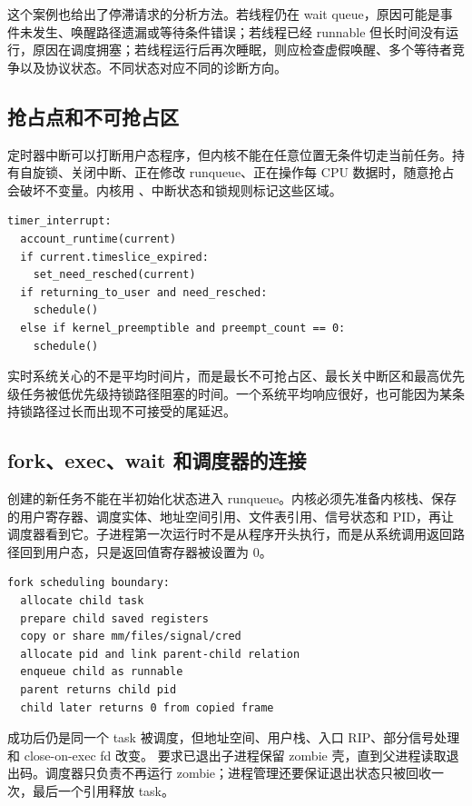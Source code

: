 这个案例也给出了停滞请求的分析方法。若线程仍在 wait queue，原因可能是事件未发生、唤醒路径遗漏或等待条件错误；若线程已经 runnable 但长时间没有运行，原因在调度拥塞；若线程运行后再次睡眠，则应检查虚假唤醒、多个等待者竞争以及协议状态。不同状态对应不同的诊断方向。

\subsection{抢占点和不可抢占区}

定时器中断可以打断用户态程序，但内核不能在任意位置无条件切走当前任务。持有自旋锁、关闭中断、正在修改 runqueue、正在操作每 CPU 数据时，随意抢占会破坏不变量。内核用 、中断状态和锁规则标记这些区域。

\begin{lstlisting}
timer_interrupt:
  account_runtime(current)
  if current.timeslice_expired:
    set_need_resched(current)
  if returning_to_user and need_resched:
    schedule()
  else if kernel_preemptible and preempt_count == 0:
    schedule()
\end{lstlisting}

实时系统关心的不是平均时间片，而是最长不可抢占区、最长关中断区和最高优先级任务被低优先级持锁路径阻塞的时间。一个系统平均响应很好，也可能因为某条持锁路径过长而出现不可接受的尾延迟。

\subsection{fork、exec、wait 和调度器的连接}

 创建的新任务不能在半初始化状态进入 runqueue。内核必须先准备内核栈、保存的用户寄存器、调度实体、地址空间引用、文件表引用、信号状态和 PID，再让调度器看到它。子进程第一次运行时不是从程序开头执行，而是从系统调用返回路径回到用户态，只是返回值寄存器被设置为 0。

\begin{lstlisting}
fork scheduling boundary:
  allocate child task
  prepare child saved registers
  copy or share mm/files/signal/cred
  allocate pid and link parent-child relation
  enqueue child as runnable
  parent returns child pid
  child later returns 0 from copied frame
\end{lstlisting}

 成功后仍是同一个 task 被调度，但地址空间、用户栈、入口 RIP、部分信号处理和 close-on-exec fd 改变。 要求已退出子进程保留 zombie 壳，直到父进程读取退出码。调度器只负责不再运行 zombie；进程管理还要保证退出状态只被回收一次，最后一个引用释放 task。

